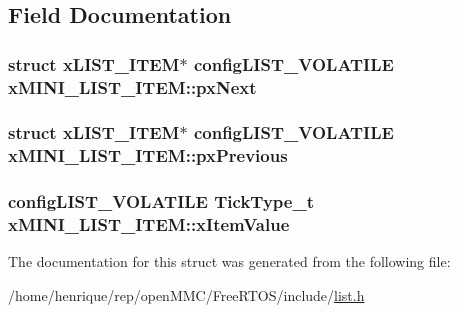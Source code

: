 \subsection{Field Documentation}
\hypertarget{structxMINI__LIST__ITEM_aa7ae770b0f10daeb9ac76c6f7dd5608e}{
\subsubsection[{px\-Next}]{\setlength{\rightskip}{0pt plus 5cm}struct {\bf x\-L\-I\-S\-T\-\_\-\-I\-T\-E\-M}$\ast$ {\bf config\-L\-I\-S\-T\-\_\-\-V\-O\-L\-A\-T\-I\-L\-E} x\-M\-I\-N\-I\-\_\-\-L\-I\-S\-T\-\_\-\-I\-T\-E\-M\-::px\-Next}}\label{structxMINI__LIST__ITEM_aa7ae770b0f10daeb9ac76c6f7dd5608e}
\hypertarget{structxMINI__LIST__ITEM_a732c666bb97560eb1b094a2c411269ab}{
\subsubsection[{px\-Previous}]{\setlength{\rightskip}{0pt plus 5cm}struct {\bf x\-L\-I\-S\-T\-\_\-\-I\-T\-E\-M}$\ast$ {\bf config\-L\-I\-S\-T\-\_\-\-V\-O\-L\-A\-T\-I\-L\-E} x\-M\-I\-N\-I\-\_\-\-L\-I\-S\-T\-\_\-\-I\-T\-E\-M\-::px\-Previous}}\label{structxMINI__LIST__ITEM_a732c666bb97560eb1b094a2c411269ab}
\hypertarget{structxMINI__LIST__ITEM_aae79c54ac1efa30959e68604cc23b29e}{
\subsubsection[{x\-Item\-Value}]{ {\bf config\-L\-I\-S\-T\-\_\-\-V\-O\-L\-A\-T\-I\-L\-E} {\bf Tick\-Type\-\_\-t} x\-M\-I\-N\-I\-\_\-\-L\-I\-S\-T\-\_\-\-I\-T\-E\-M\-::x\-Item\-Value}}\label{structxMINI__LIST__ITEM_aae79c54ac1efa30959e68604cc23b29e}


The documentation for this struct was generated from the following file\-:\begin{DoxyCompactItemize}
\item 
/home/henrique/rep/open\-M\-M\-C/\-Free\-R\-T\-O\-S/include/\hyperlink{list_8h}{list.\-h}\end{DoxyCompactItemize}
